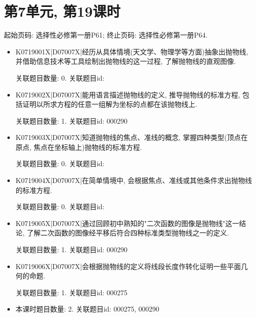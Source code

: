 \section*{第7单元, 第19课时}
起始页码: 选择性必修第一册P61; 终止页码: 选择性必修第一册P64.
\begin{itemize}
\item K0719001X|D07007X|经历从具体情境(天文学、物理学等方面)抽象出抛物线, 并借助信息技术等工具绘制出抛物线的这一过程, 了解抛物线的直观图像.

关联题目数量: 0. 关联题目id: 

\item K0719002X|D07007X|能用语言描述抛物线的定义, 推导抛物线的标准方程, 包括证明以所求方程的任意一组解为坐标的点都在该抛物线上.

关联题目数量: 1. 关联题目id: 000290

\item K0719003X|D07007X|知道抛物线的焦点、准线的概念, 掌握四种类型(顶点在原点, 焦点在坐标轴上)抛物线的标准方程.

关联题目数量: 0. 关联题目id: 

\item K0719004X|D07007X|在简单情境中, 会根据焦点、准线或其他条件求出抛物线的标准方程.

关联题目数量: 0. 关联题目id: 

\item K0719005X|D07007X|通过回顾初中熟知的"二次函数的图像是抛物线"这一结论, 了解二次函数的图像经平移后符合四种标准类型抛物线之一的定义.

关联题目数量: 1. 关联题目id: 000290

\item K0719006X|D07007X|会根据抛物线的定义将线段长度作转化证明一些平面几何的命题.

关联题目数量: 1. 关联题目id: 000275

\item 本课时题目数量: 2. 关联题目id: 000275, 000290

\end{itemize}

